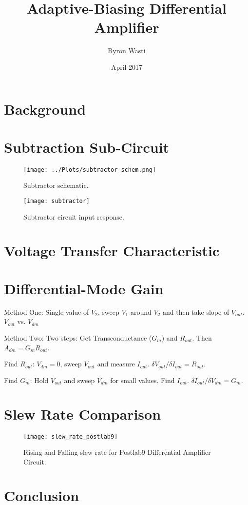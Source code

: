 \documentclass{article}
\title{Adaptive-Biasing Differential Amplifier}
\author{Byron Wasti}
\date{April 2017}
\begin{document}
\maketitle

\section{Background}

\section{Subtraction Sub-Circuit}

\begin{figure}[ht!]
    \centering
    \texttt{[image: ../Plots/subtractor\_schem.png]}
    \caption{Subtractor schematic.}
    \label{fig:postlab9}
\end{figure}

\begin{figure}[ht!]
    \centering
    \texttt{[image: subtractor]}
    \caption{Subtractor circuit input response.}
    \label{fig:postlab9}
\end{figure}

\section{Voltage Transfer Characteristic}

\section{Differential-Mode Gain}

Method One:
Single value of $V_2$, sweep $V_1$ around $V_2$ and then take slope of $V_{out}$. $V_{out}$ vs. $V_{dm}$

Method Two:
Two steps: Get Transconductance ($G_{m}$) and $R_{out}$. Then $A_{dm} = G_{m} R_{out}$.

Find $R_{out}$: $V_{dm} = 0$, sweep $V_{out}$ and measure $I_{out}$. $\delta V_{out} / \delta I_{out} = R_{out}$.

Find $G_{m}$: Hold $V_{out}$ and sweep $V_{dm}$ for small values. Find $I_{out}$. $\delta I_{out} / \delta V_{dm} = G_{m}$.


\section{Slew Rate Comparison}

\begin{figure}[ht!]
    \centering
    \texttt{[image: slew\_rate\_postlab9]}
    \caption{Rising and Falling slew rate for Postlab9 Differential Amplifier Circuit.}
    \label{fig:postlab9}
\end{figure}

\section{Conclusion}
\end{document}
